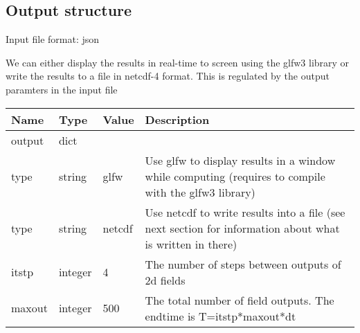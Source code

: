 \subsection{Output structure}
Input file format: json

We can either display the results in real-time to screen using the glfw3 library or
write the results to a file in netcdf-4 format.
This is regulated by the output paramters in the input file
\begin{longtable}{lllp{7cm}}
\toprule
\rowcolor{gray!50}\textbf{Name} &  \textbf{Type} & \textbf{Value}  & \textbf{Description}  \\ \midrule
output & dict & & \\
\qquad type  & string& glfw & Use glfw to display results in a window while computing (requires to compile with the glfw3 library) \\
\qquad type  & string& netcdf & Use netcdf to write results into a file (see next section for information about what is written in there) \\
\qquad itstp  & integer& 4 & The number of steps between outputs of 2d fields \\
\qquad maxout  & integer& 500 & The total number of field outputs. The endtime is T=itstp*maxout*dt \\
\bottomrule
\end{longtable}
